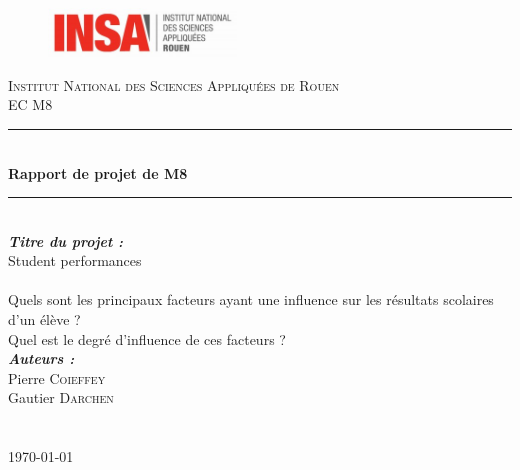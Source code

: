 \documentclass[11pt]{article}
\begin{document}
\begin{titlepage}
\thispagestyle{empty}
\begin{figure}
\includegraphics[width=5cm]{Insa.png}\hfill
\end{figure}

\newcommand{\HRule}{\rule{\linewidth}{0.5mm}} 
\center 
{}\textsc{\huge Institut National des Sciences Appliqu\'{e}es de Rouen}\\[1.5cm] 
\textsc{\Large EC M8}\\[2cm] 

\HRule \\[0.4cm]
{ \huge \bfseries Rapport de projet de M8}\\[0.2cm] 
\HRule \\[2.5cm]
 
\LARGE \emph{\textbf{Titre du projet : }}\\
\LARGE{ \og Student performances \fg}\\
~\\

\Large{
Quels sont les principaux facteurs ayant une influence sur les résultats scolaires d'un élève ?\\ Quel est le degré d'influence de ces facteurs ?}\\[2cm] 


\large \emph{\textbf{Auteurs :}}\\
Pierre \textsc{Coieffey}\\
Gautier \textsc{Darchen}\\ 

~\\ ~\\[1cm]



\vfill{\today}\\[3cm]

\end{titlepage}

\newpage

\tableofcontents

\newpage
\end{document}
